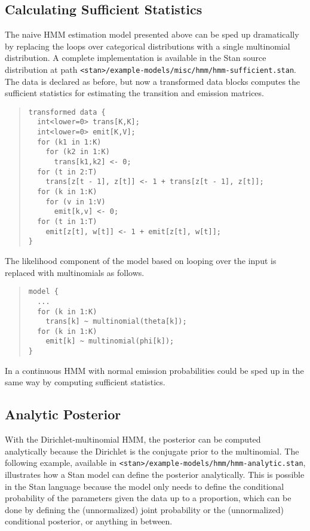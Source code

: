 \subsection{Calculating Sufficient Statistics}

The naive HMM estimation model presented above can be sped up
dramatically by replacing the loops over categorical distributions
with a single multinomial distribution.  A complete implementation is
available in the Stan source distribution at path
\nolinkurl{<stan>/example-models/misc/hmm/hmm-sufficient.stan}.  The data
is declared as before, but now a transformed data blocks computes the
sufficient statistics for estimating the transition and emission
matrices.
%
\begin{quote}
\begin{Verbatim}[fontsize=\small]
transformed data {
  int<lower=0> trans[K,K];
  int<lower=0> emit[K,V];
  for (k1 in 1:K) 
    for (k2 in 1:K)
      trans[k1,k2] <- 0;
  for (t in 2:T)
    trans[z[t - 1], z[t]] <- 1 + trans[z[t - 1], z[t]];
  for (k in 1:K)
    for (v in 1:V)
      emit[k,v] <- 0;
  for (t in 1:T)
    emit[z[t], w[t]] <- 1 + emit[z[t], w[t]];
}
\end{Verbatim}
\end{quote}
%
The likelihood component of the model based on looping over the input
is replaced with multinomials as follows.
%
\begin{quote}
\begin{verbatim}
model {
  ...
  for (k in 1:K)
    trans[k] ~ multinomial(theta[k]);
  for (k in 1:K)
    emit[k] ~ multinomial(phi[k]);
}
\end{verbatim}
\end{quote}
%
In a continuous HMM with normal emission probabilities could be sped
up in the same way by computing sufficient statistics.

\subsection{Analytic Posterior}

With the Dirichlet-multinomial HMM, the posterior can be computed
analytically because the Dirichlet is the conjugate prior to the
multinomial.  The following example, available in
\nolinkurl{<stan>/example-models/hmm/hmm-analytic.stan}, illustrates how a
Stan model can define the posterior analytically.  This is possible in
the Stan language because the model only needs to define the
conditional probability of the parameters given the data up to a
proportion, which can be done by defining the (unnormalized) joint
probability or the (unnormalized) conditional posterior, or anything
in between.  

